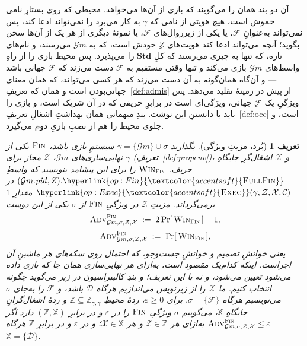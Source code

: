 \documentclass[10pt,oneside,openany]{book}
\newcommand{\PID}{\mathit{pid}}
\newcommand{\Stdpid}{\mathbf{Std}}
\newcommand{\Corr}{\mathcal{C}}
\newcommand{\F}{\mathcal{F}}
\newcommand{\Zenv}{\mathcal{Z}}
\newcommand{\Dum}{\mathcal{D}}
\newcommand{\advtg}{\op{Adv}}
\newcommand{\padv}[2]{\advtg^{#1}_{#2}}
\newcommand{\ZenvSet}{\mathbb{Z}}
\newcommand{\op}[1]{\textnormal{\textsc{#1}}}
\newcommand{\opl}[1]{\hyperlink{op:#1}{\textcolor{accentsoft}{\op{#1}}}}
\newcommand{\fopl}[1]{\hyperlink{op:#1}{\textcolor{accentsoft}{\op{Full}\op{#1}}}}
\newcommand{\Gm}{\mathcal{G}m}
\newcommand{\Xset}{\mathbb{X}}
\newcommand{\Win}{\op{Win}}
\theoremstyle{accentdef}
\newtheorem{definition}{تعریف}[chapter]
\theoremstyle{accentplain}
\begin{document}
آن دو بند همان را می‌گویند که بازی از آن‌ها می‌خواهد. محیطی که روی بستارِ
نامی خموش است، هیچ هویتی از نامی که $\gamma$ به کار می‌برد را نمی‌تواند
ادعا کند، پس نمی‌تواند به‌عنوانِ $\F$، یا یکی از زیرروال‌های $\F$، یا
نمونهٔ دیگری از هر یک از آن‌ها سخن بگوید؛ آنچه می‌تواند ادعا کند
هویت‌های $Z$ِ خودش است، که به $\Gm$ می‌رسند، و نام‌های تازه، که تنها به
چیزی می‌رسند که کلِ $\Stdpid$ را می‌پذیرد. پس محیط بازی را از راهِ
واسط‌های $\Gm$ بازی می‌کند و تنها وقتی مستقیم به $\F$ دست می‌زند که $\F$
جهانی باشد --- و آن‌گاه همان‌گونه به آن دست می‌زند که هر کسی می‌تواند، که
همان معنای جهانی‌بودن است و همان که تعریفِ~\ref{def:admis} از پیش در
زمینهٔ تقلید می‌دهد. پس ویژگیِ یک $\F$ِ جهانی، ویژگی‌ای است در برابرِ حریفی
که در آن شریک است، و بازی را باید با دانستنِ این نوشت. بندِ میهمانی همان
بهداشتِ اشغالِ تعریفِ~\ref{def:occ} است، و جلوی محیط را هم از نصبِ بازیِ
دوم می‌گیرد.

\begin{definition}[بُرد، مزیتِ ویژگی]\label{def:propadv}
بگذارید $\gamma = \{\Gm\} \cup \sigma$ سیستمِ بازی باشد، $\op{Fin}$ یکی از
نهایی‌سازی‌های $\Gm$، $\Zenv$ مجاز برای $\gamma$
(تعریفِ~\ref{def:propenv})، و $\mathcal{X}$ اشغال‌گرِ جایگاهِ حریف.
$\Win_{\op{Fin}}$ را برای این پیشامد بنویسید که واسطِ
$(\Gm.\PID,Z).\fopl{Fin}$ در $\opl{Exec}(\gamma,\Zenv,\mathcal{X},\Corr)$
مقدارِ $1$ برمی‌گرداند. \emph{مزیتِ} $\Zenv$ در ویژگیِ $\op{Fin}$ از
$\sigma$ یکی از این دوست
\[
  \begin{gathered}
  \padv{\op{Fin}}{\Gm,\sigma,\Zenv,\mathcal{X}} \;:=\; 2\Pr[\,\Win_{\op{Fin}}\,] - 1 , \\[3pt]
  \padv{\op{Fin}}{\Gm,\sigma,\Zenv,\mathcal{X}} \;:=\; \Pr[\,\Win_{\op{Fin}}\,] ,
  \end{gathered}
\]
یعنی خوانشِ \emph{تصمیم} و خوانشِ \emph{جست‌وجو}، که احتمال روی سکه‌های هر
ماشینِ آن اجراست. اینکه کدام‌یک مقصود است، به‌ازای هر نهایی‌سازی همان جا که
بازی داده می‌شود تعیین می‌شود، و نه با این تعریف؛ و بندِ کالیبراسیون در
زیر می‌گوید چگونه انتخاب کنیم. ما $\mathcal{X}$ را از زیرنویس می‌اندازیم
هرگاه $\Dum$ باشد، و $\F$ را به‌جای $\sigma$ می‌نویسیم هرگاه $\sigma =
\{\F\}$. برای $\varepsilon \geq 0$، ردهٔ محیطِ $\ZenvSet \subseteq
\ZenvSet_{\gamma,\gamma}$ و ردهٔ اشغال‌گرانِ جایگاهِ $\Xset$، می‌گوییم
$\sigma$ ویژگیِ $\op{Fin}$ را \emph{در $\varepsilon$ و در برابرِ}
$(\ZenvSet,\Xset)$ دارد اگر
$\padv{\op{Fin}}{\Gm,\sigma,\Zenv,\mathcal{X}} \leq \varepsilon$ به‌ازای هر
$\Zenv \in \ZenvSet$ و هر $\mathcal{X} \in \Xset$؛ و \emph{در $\varepsilon$
و در برابرِ $\ZenvSet$} هرگاه $\Xset = \{\Dum\}$.
\end{definition}
\end{document}
